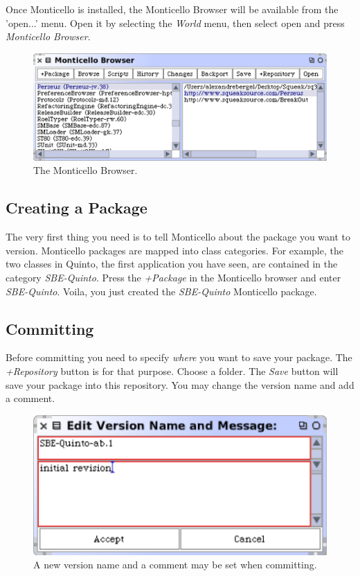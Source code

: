\documentclass[a4paper,10pt,twoside]{book}
\begin{document}
Once Monticello is installed, the Monticello Browser will be available from the 'open...' menu. Open it by selecting the \emph{World} menu, then select open and press \emph{Monticello Browser}.

\begin{figure}[ht]\centering
	\includegraphics[width=.75\linewidth]{monticello.png}
	\caption{The Monticello Browser.}
\end{figure}


\subsection{Creating a Package}

The very first thing you need is to tell Monticello about the package you want to version. Monticello packages are mapped into class categories. For example, the two classes in Quinto, the first application you have seen, are contained in the category \emph{SBE-Quinto}. Press the \emph{+Package} in the Monticello browser and enter \emph{SBE-Quinto}. Voila, you just created the \emph{SBE-Quinto} Monticello package. 

\subsection{Committing}

Before committing you need to specify \emph{where} you want to save your package. The \emph{+Repository} button is for that purpose. Choose a folder. The \emph{Save} button will save your package into this repository. You may change the version name and add a comment. 

\begin{figure}[ht]\centering
	\includegraphics[width=.55\linewidth]{saving.png}
	\caption{A new version name and a comment may be set when committing.}
\end{figure}
\end{document}
